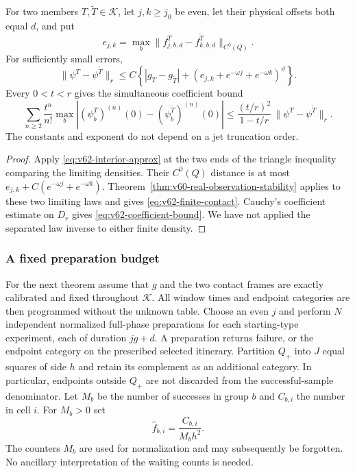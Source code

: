 \begin{theorem}
\label{thm:v62-finite-contact}
For two members $T,\widetilde T\in\mathcal K$, let $j,k\ge j_0$ be
even, let their physical offsets both equal $d$, and put
\[
 e_{j,k}=\max_b\|f_{j,b,d}^{T}-f_{k,b,d}^{\widetilde T}\|_{C^0(Q)}.
\]
For sufficiently small errors,
\begin{equation}\label{eq:v62-finite-contact}
 \|\psi^T-\psi^{\widetilde T}\|_r
 \le C\left\{|g_T-g_{\widetilde T}|+
       (e_{j,k}+e^{-\omega j}+e^{-\omega k})^\vartheta\right\}.
\end{equation}
Every $0<t<r$ gives the simultaneous coefficient bound
\begin{equation}\label{eq:v62-coefficient-bound}
 \sum_{n\ge2}\frac{t^n}{n!}
       \max_b| (\psi_b^T)^{(n)}(0)
                       -(\psi_b^{\widetilde T})^{(n)}(0)|
 \le \frac{(t/r)^2}{1-t/r}\,
                          \|\psi^T-\psi^{\widetilde T}\|_r.
\end{equation}
The constants and exponent do not depend on a jet truncation order.
\end{theorem}

\begin{proof}
Apply \eqref{eq:v62-interior-approx} at the two ends of the triangle
inequality comparing the limiting densities.  Their $C^0(Q)$ distance
is at most $e_{j,k}+C(e^{-\omega j}+e^{-\omega k})$.
Theorem~\ref{thm:v60-real-observation-stability} applies to these two
limiting laws and gives \eqref{eq:v62-finite-contact}.  Cauchy's
coefficient estimate on $D_r$ gives
\eqref{eq:v62-coefficient-bound}.  We have not applied the separated
law inverse to either finite density.
\end{proof}

\subsubsection*{A fixed preparation budget}
For the next theorem assume that $g$ and the two contact frames are
exactly calibrated and fixed throughout $\mathcal K$.  All window times
and endpoint categories are then programmed without the unknown table.
Choose an even $j$ and perform $N$ independent normalized full-phase
preparations for each starting-type experiment, each of duration $jg+d$.
A preparation returns failure, or the endpoint category on the prescribed
selected itinerary.  Partition $Q_+$ into $J$ equal squares of side $h$
and retain its complement as an additional category.  In particular,
endpoints outside $Q_+$ are not discarded from the successful-sample
denominator.  Let $M_b$ be the number of successes in group $b$ and
$C_{b,i}$ the number in cell $i$.  For $M_b>0$ set
\begin{equation}\label{eq:v62-observed-cell-density}
                 \widehat f_{b,i}=\frac{C_{b,i}}{M_bh^2}.
\end{equation}
The counters $M_b$ are used for normalization and may subsequently be
forgotten.  No ancillary interpretation of the waiting counts is needed.

